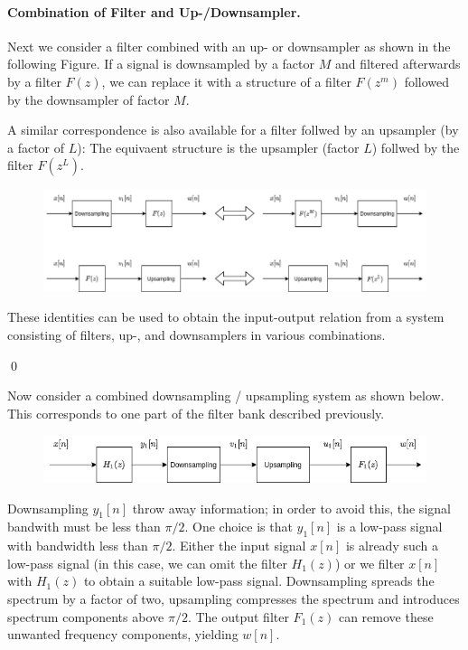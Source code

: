 \paragraph{Combination of Filter and Up-/Downsampler.} Next we consider a filter combined with an up- or downsampler as shown in the following Figure. If a signal is downsampled by a factor $M$ and filtered afterwards by a filter $F(z)$, we can replace it with a structure of a filter $F(z^m)$ followed by the downsampler of factor $M$.

A similar correspondence is also available for a filter follwed by an upsampler (by a factor of $L$): The equivaent structure is the upsampler (factor $L$) follwed by the filter $F(z^L)$. 


\begin{figure}[H]
    \centering
    \includegraphics[scale=0.45]{images/2021-11-09-subband_06a.png}
\end{figure}

These identities can be used to obtain the input-output relation from a system consisting of filters, up-, and downsamplers in various combinations.

\qed

Now consider a combined downsampling / upsampling system as shown below. This corresponds to one part of the filter bank described previously.


\begin{figure}[H]
    \centering
    \includegraphics[scale=0.5]{images/2021-11-09-subband_07.png}
\end{figure}

Downsampling $y_1[n]$ throw away information; in order to avoid this, the signal bandwith must be less than $\pi/2$. One choice is that  $y_1[n]$ is a low-pass signal with bandwidth less than $\pi/2$. Either the input signal $x[n]$ is already such a low-pass signal (in this case, we can omit the filter $H_1(z)$) or we filter $x[n]$ with $H_1(z)$ to obtain a suitable low-pass signal. Downsampling spreads the spectrum by a factor of two, upsampling compresses the spectrum and introduces spectrum components above $\pi/2$. The output filter $F_1(z)$ can remove these unwanted frequency components, yielding $w[n]$.

